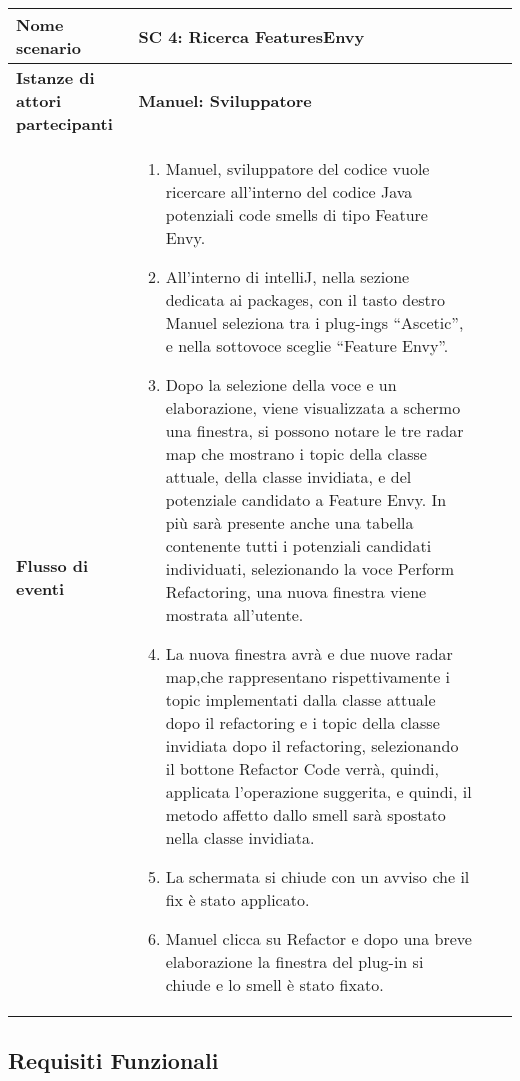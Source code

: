 		\begin{tabular}{|l|p{8cm}|p{1cm}|p{1.1cm}|}
			\hline
			\textbf{Nome scenario}  & \textbf{SC 4: Ricerca FeaturesEnvy} \\ \hline
			\textbf{Istanze di attori partecipanti}  & \textbf{Manuel: Sviluppatore} \\ \hline
			\textbf{Flusso di eventi}  & \begin{enumerate}
				\item Manuel, sviluppatore del codice vuole ricercare all’interno del codice Java potenziali code smells di tipo Feature Envy. 
				\item All’interno di intelliJ, nella sezione dedicata ai packages, con il tasto destro Manuel seleziona tra i plug-ings “Ascetic”, e nella sottovoce sceglie “Feature Envy”.
				\item Dopo la selezione della voce e un elaborazione, viene visualizzata a schermo una finestra, si possono notare le tre radar map che mostrano i topic della classe attuale, della classe invidiata, e del potenziale candidato a Feature Envy. In più sarà presente anche una tabella contenente tutti i potenziali candidati individuati, selezionando la voce Perform Refactoring, una nuova finestra viene mostrata all’utente.
				\item  La nuova finestra avrà e due nuove radar map,che rappresentano rispettivamente i topic implementati dalla classe attuale dopo il refactoring e i topic della classe invidiata dopo il refactoring, selezionando il bottone Refactor Code verrà, quindi, applicata l’operazione suggerita, e quindi, il metodo affetto dallo smell sarà spostato nella classe invidiata.
				\item La schermata si chiude con un avviso che il fix è stato applicato.
				\item Manuel clicca su Refactor e dopo una breve elaborazione la finestra del plug-in si chiude e lo smell è stato fixato.\end{enumerate} \\ \hline
		\end{tabular}

	\newpage
	
		\subsection{Requisiti Funzionali}
